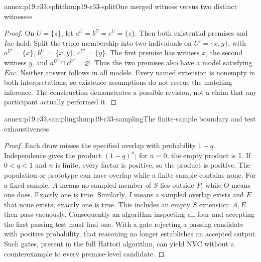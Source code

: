 \begin{annexitem}{annex:p19.r33.split}{thm:p19-r33-split}{One merged witness versus two distinct witnesses}
\begin{proof}
On \(U=\{z\}\), let \(a^U=b^U=c^U=\{z\}\).
Then both existential premises and \(Iac\) hold. Split the triple
membership into two individuals on \(U'=\{x,y\}\), with
\(a^{U'}=\{x\}\), \(b^{U'}=\{x,y\}\),
\(c^{U'}=\{y\}\). The first premise has witness \(x\),
the second witness \(y\), and \(a^{U'}\cap c^{U'}=\varnothing\).
Thus the two premises also have a model satisfying \(Eac\).
Neither answer follows in all models. Every named extension is nonempty
in both interpretations, so existence assumptions do not rescue the
matching inference. The construction demonstrates a possible revision,
not a claim that any participant actually performed it.
\end{proof}
\end{annexitem}

\begin{annexitem}{annex:p19.r33.sampling}{thm:p19-r33-sampling}{The finite-sample boundary and test exhaustiveness}
\begin{proof}
Each draw misses the specified overlap with probability \(1-q\).
Independence gives the product \((1-q)^n\); for \(n=0\), the
empty product is 1. If \(0<q<1\) and \(n\) is finite, every
factor is positive, so the product is positive. The population or
prototype can have overlap while a finite sample contains none.
For a fixed sample, \(A\) means no sampled member of \(S\)
lies outside \(P\), while \(O\) means one does. Exactly one
is true. Similarly, \(I\) means a sampled overlap exists and
\(E\) that none exists; exactly one is true. This includes an
empty \(S\) extension: \(A,E\) then pass vacuously.
Consequently an algorithm inspecting all four and accepting the first
passing test must find one. With a gate rejecting a passing candidate
with positive probability, that reasoning no longer establishes an
accepted output. Such gates, present in the full Hattori algorithm,
can yield NVC without a counterexample to every premise-level candidate.
\end{proof}
\end{annexitem}

